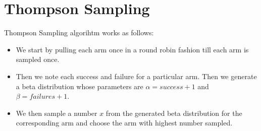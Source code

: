\documentclass{article}
\begin{document}
\section{Thompson Sampling}
Thompson Sampling algorihtm works as follows:
\begin{itemize}
\item We start by pulling each arm once in a round robin fashion till each arm is sampled once.
\item Then we note each success and failure for a particular arm. Then we generate a beta distribution whose parameters are $\alpha = success + 1$ and $\beta = failures + 1$.
\item We then sample a number $x$ from the generated beta distribution for the corresponding arm and choose the arm with highest number sampled.
\end{itemize}
\end{document}
